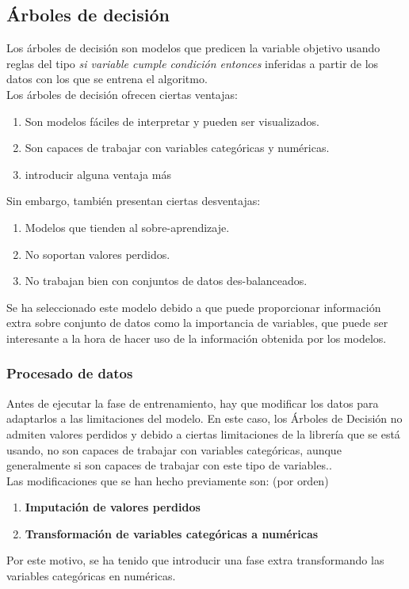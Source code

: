 \subsection{Árboles de decisión}
\label{alg:dec_tree}
Los árboles de decisión son modelos que predicen la variable objetivo usando reglas del tipo \textit{si variable cumple condición entonces } inferidas a partir de los datos con los que se entrena el algoritmo.\\
Los árboles de decisión ofrecen ciertas ventajas:
\begin{enumerate}
	\item Son modelos fáciles de interpretar y pueden ser visualizados.
	\item Son capaces de trabajar con variables categóricas y numéricas.
	\item introducir alguna ventaja más
\end{enumerate}
Sin embargo, también presentan ciertas desventajas:
\begin{enumerate}
	\item Modelos que tienden al sobre-aprendizaje.
	\item No soportan valores perdidos.
	\item No trabajan bien con conjuntos de datos des-balanceados.
\end{enumerate}
Se ha seleccionado este modelo debido a que puede proporcionar información extra sobre conjunto de datos como la importancia de variables, que puede ser interesante a la hora de hacer uso de la información obtenida por los modelos.
\subsubsection*{Procesado de datos}
Antes de ejecutar la fase de entrenamiento, hay que modificar los datos para adaptarlos a las limitaciones del modelo. En este caso,  los Árboles de Decisión no admiten valores perdidos y debido a ciertas limitaciones de la librería que se está usando,  no son capaces de trabajar con variables categóricas, aunque generalmente si son capaces de trabajar con este tipo de variables..\\
Las modificaciones que se han hecho previamente son: (por orden)
\begin{enumerate}
	\item \textbf{Imputación de valores perdidos}
	\item \textbf{Transformación de variables categóricas a numéricas}
\end{enumerate}
Por este motivo, se ha tenido que introducir una fase extra transformando las variables categóricas en numéricas.
